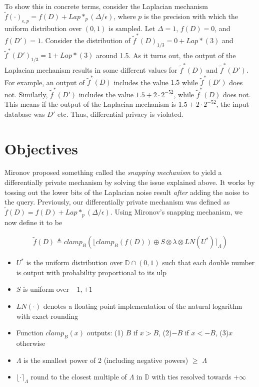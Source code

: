 \documentclass[11pt]{exam}
\begin{document}
To show this in concrete terms, consider the Laplacian mechanism $\tilde{f}(\cdot)_{\epsilon,p} = f(D) + Lap*_p (\Delta/\epsilon)$, where $p$ is the precision with which the uniform distribution over $(0,1)$ is sampled.  Let $\Delta = 1$, $f(D) = 0$, and $f(D') = 1$.  Consider the distribution of $\tilde{f}^*(D)_{1/3} = 0 + Lap*(3)$ and $\tilde{f}^*(D')_{1/3} = 1 + Lap*(3)$ around 1.5.  As it turns out, the output of the Laplacian mechanism results in some different values for $\tilde{f}^*(D)$ and $\tilde{f}^*(D')$.  For example, an output of $\tilde{f}^*(D)$ includes the value $1.5$ while $\tilde{f}^*(D')$ does not.  Similarly, $\tilde{f}^*(D')$ includes the value $1.5 + 2 \cdot 2^{-52}$, while $\tilde{f}^*(D)$ does not.  This means if the output of the Laplacian mechanism is $1.5 + 2 \cdot 2^{-52}$, the input database was $D'$ etc.  Thus, differential privacy is violated.

\section{Objectives} 

Mironov proposed something called the \textit{snapping mechanism} to yield a differentially private mechanism by solving the issue explained above.  It works by tossing out the lower bits of the Laplacian noise result \textit{after} adding the noise to the query.  Previously, our differentially private mechanism was defined as $\tilde{f}(D) = f(D) + Lap*_p (\Delta/\epsilon)$.  Using Mironov's snapping mechanism, we now define it to be

\begin{align}
    \tilde{f}(D) \triangleq clamp_{B}(\lfloor clamp_{B}(f(D)) \oplus S \otimes \lambda \otimes LN(U^{*})  \rceil_{\Lambda}) 
\end{align}
\begin{itemize}
    \item $U^{*}$ is the uniform distribution over $\mathbb{D} \cap(0,1)$ such that each double number is output with probability proportional to its ulp
    \item $S$ is uniform over ${-1,+1}$
    \item $LN(\cdot)$ denotes a floating point implementation of the natural logarithm with exact rounding 
    \item Function $clamp_{B}(x)$ outputs: (1) $B$ if $x>B$, (2)$-B$ if $x<-B$, (3)$x$ otherwise
    \item $\Lambda$ is the smallest power of 2 (including negative powers) $\geq$ $\Lambda$ 
    \item $\lfloor \cdot \rceil_{\Lambda}$ round to the closest multiple of $\Lambda$ in $\mathbb{D}$ with ties resolved towards $+\infty$
\end{itemize}
\end{document}
